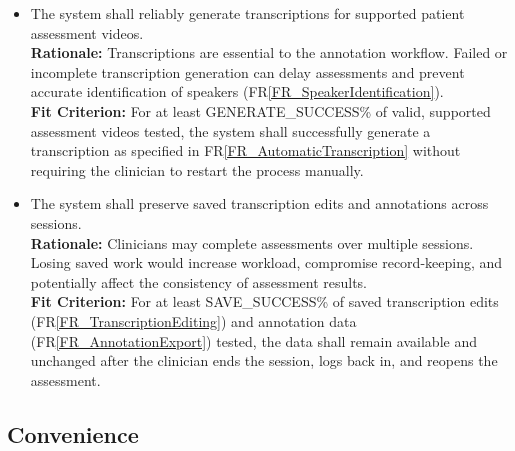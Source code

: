 \documentclass[12pt]{article}
\newcommand{\rref}[1]{FR\ref{#1}}
\newcounter{nfrnum} %
\newcommand{\rthenfrnum}{NFR\thenfrnum}
\begin{document}
\noindent \begin{itemize}

\item[\textbf{\rthenfrnum}:]
\label{NFR-RE1}
The system shall reliably generate transcriptions for supported patient assessment videos.
  \\ \textbf{Rationale:} Transcriptions are essential to the annotation workflow. Failed or incomplete transcription generation can delay assessments and prevent accurate identification of speakers (\rref{FR_SpeakerIdentification}).
  \\ \textbf{Fit Criterion:} For at least GENERATE\_SUCCESS\% of valid, supported assessment videos tested, the system shall successfully generate a transcription as specified in {\rref{FR_AutomaticTranscription}} without requiring the clinician to restart the process manually.

\item[\textbf{\rthenfrnum}:]
\label{NFR-RE2}
The system shall preserve saved transcription edits and annotations across sessions.
  \\ \textbf{Rationale:} Clinicians may complete assessments over multiple sessions. Losing saved work would increase workload, compromise record-keeping, and potentially affect the consistency of assessment results.
  \\ \textbf{Fit Criterion:} For at least SAVE\_SUCCESS\% of saved transcription edits (\rref{FR_TranscriptionEditing}) and annotation data (\rref{FR_AnnotationExport}) tested, the data shall remain available and unchanged after the clinician ends the session, logs back in, and reopens the assessment.

\end{itemize}

\subsection{Convenience}
\end{document}
